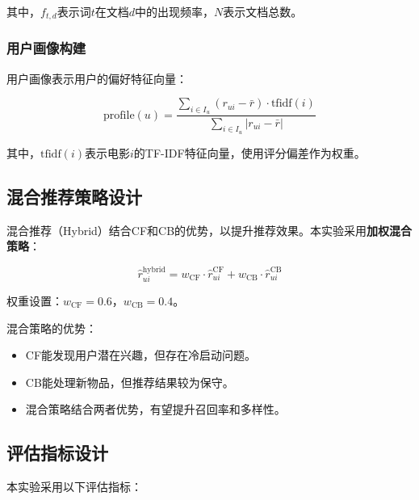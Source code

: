 \documentclass[a4paper]{article}
\begin{document}
其中，$f_{t,d}$表示词$t$在文档$d$中的出现频率，$N$表示文档总数。

\subsubsection{用户画像构建}

用户画像表示用户的偏好特征向量：

\begin{equation}
\text{profile}(u) = \frac{\sum_{i \in I_u} (r_{ui} - \bar{r}) \cdot \text{tfidf}(i)}{\sum_{i \in I_u} |r_{ui} - \bar{r}|}
\end{equation}

其中，$\text{tfidf}(i)$表示电影$i$的TF-IDF特征向量，使用评分偏差作为权重。

\subsection{混合推荐策略设计}

混合推荐（Hybrid）结合CF和CB的优势，以提升推荐效果。本实验采用\textbf{加权混合策略}：

\begin{equation}
\hat{r}_{ui}^{\text{hybrid}} = w_{\text{CF}} \cdot \hat{r}_{ui}^{\text{CF}} + w_{\text{CB}} \cdot \hat{r}_{ui}^{\text{CB}}
\end{equation}

权重设置：$w_{\text{CF}} = 0.6$，$w_{\text{CB}} = 0.4$。

混合策略的优势：
\begin{itemize}
    \item CF能发现用户潜在兴趣，但存在冷启动问题。
    \item CB能处理新物品，但推荐结果较为保守。
    \item 混合策略结合两者优势，有望提升召回率和多样性。
\end{itemize}

\subsection{评估指标设计}

本实验采用以下评估指标：
\end{document}
